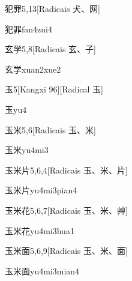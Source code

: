 \begin{entry}{犯罪}{5,13}[Radicais ⽝、⽹]
  \begin{phonetics}{犯罪}{fan4zui4}
  \end{phonetics}
\end{entry}

\begin{entry}{玄学}{5,8}[Radicais ⽞、⼦]
  \begin{phonetics}{玄学}{xuan2xue2}
  \end{phonetics}
\end{entry}

\begin{entry}{玉}{5}[Kangxi 96][Radical ⽟]
  \begin{phonetics}{玉}{yu4}
  \end{phonetics}
\end{entry}

\begin{entry}{玉米}{5,6}[Radicais ⽟、⽶]
  \begin{phonetics}{玉米}{yu4mi3}
  \end{phonetics}
\end{entry}

\begin{entry}{玉米片}{5,6,4}[Radicais ⽟、⽶、⽚]
  \begin{phonetics}{玉米片}{yu4mi3pian4}
  \end{phonetics}
\end{entry}

\begin{entry}{玉米花}{5,6,7}[Radicais ⽟、⽶、⾋]
  \begin{phonetics}{玉米花}{yu4mi3hua1}
  \end{phonetics}
\end{entry}

\begin{entry}{玉米面}{5,6,9}[Radicais ⽟、⽶、⾯]
  \begin{phonetics}{玉米面}{yu4mi3mian4}
  \end{phonetics}
\end{entry}

